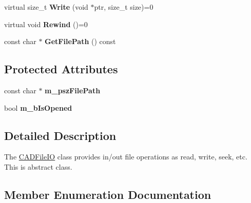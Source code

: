 \begin{DoxyCompactItemize}
\item 
virtual size\+\_\+t {\bfseries Write} (void $\ast$ptr, size\+\_\+t size)=0\hypertarget{class_c_a_d_file_i_o_a95a9d0c0bfd80745c3518fbad9deba23}{}\label{class_c_a_d_file_i_o_a95a9d0c0bfd80745c3518fbad9deba23}

\item 
virtual void {\bfseries Rewind} ()=0\hypertarget{class_c_a_d_file_i_o_a6b56667f2314c4e723e6ec08c6b25239}{}\label{class_c_a_d_file_i_o_a6b56667f2314c4e723e6ec08c6b25239}

\item 
const char $\ast$ {\bfseries Get\+File\+Path} () const \hypertarget{class_c_a_d_file_i_o_a822fa996646f385af02347573c72595a}{}\label{class_c_a_d_file_i_o_a822fa996646f385af02347573c72595a}

\end{DoxyCompactItemize}
\subsection*{Protected Attributes}
\begin{DoxyCompactItemize}
\item 
const char $\ast$ {\bfseries m\+\_\+psz\+File\+Path}\hypertarget{class_c_a_d_file_i_o_ad599920913832905e953bdd1f756d581}{}\label{class_c_a_d_file_i_o_ad599920913832905e953bdd1f756d581}

\item 
bool {\bfseries m\+\_\+b\+Is\+Opened}\hypertarget{class_c_a_d_file_i_o_ae5136f019aca44848d9f366f1cb61d4f}{}\label{class_c_a_d_file_i_o_ae5136f019aca44848d9f366f1cb61d4f}

\end{DoxyCompactItemize}


\subsection{Detailed Description}
The \hyperlink{class_c_a_d_file_i_o}{C\+A\+D\+File\+IO} class provides in/out file operations as read, write, seek, etc. This is abstract class. 

\subsection{Member Enumeration Documentation}
